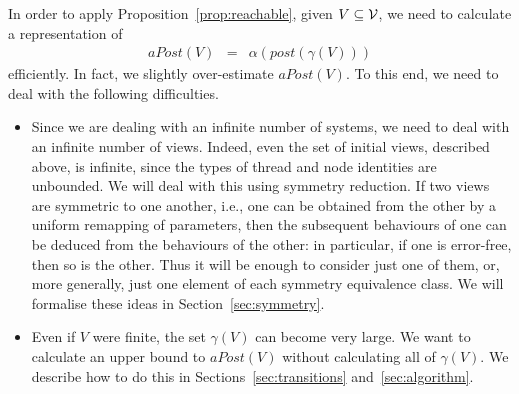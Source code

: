 In order to apply Proposition~\ref{prop:reachable}, given $V \subseteq \mathcal{V}$, we
need to calculate a representation of
%
\begin{eqnarray*}
aPost(V) & = & \alpha(post(\gamma(V)))
\end{eqnarray*}
efficiently.  In fact, we slightly over-estimate $aPost(V)$.  To this end, we
need to deal with the following difficulties.
%
\begin{itemize}
\item Since we are dealing with an infinite number of systems, we need to deal
  with an infinite number of views.  Indeed, even the set of initial views,
  described above, is infinite, since the types of thread and node identities
  are unbounded.  We will deal with this using symmetry reduction.  If two
  views are symmetric to one another, i.e., one can be obtained from the other
  by a uniform remapping of parameters, then the subsequent behaviours of one
  can be deduced from the behaviours of the other: in particular, if one is
  error-free, then so is the other.  Thus it will be enough to consider just
  one of them, or, more generally, just one element of each symmetry
  equivalence class.  We will formalise these ideas in
  Section~\ref{sec:symmetry}.

\item Even if $V$ were finite, the set $\gamma(V)$ can become very large.  We
  want to calculate an upper bound to $aPost(V)$ without calculating all of
  $\gamma(V)$.  We describe how to do this in Sections~\ref{sec:transitions}
  and~\ref{sec:algorithm}.
\end{itemize}




